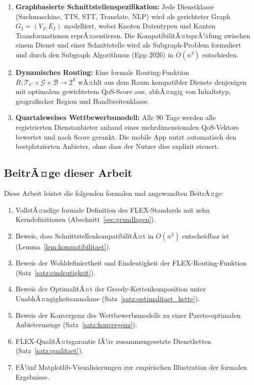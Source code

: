 ﻿\documentclass[a4paper,12pt]{article}
\theoremstyle{definition}
\begin{document}
\begin{enumerate}
    \item \textbf{Graphbasierte Schnittstellenspezifikation:} Jede Dienstklasse (Suchmaschine, TTS, STT, Translate, NLP) wird als gerichteter Graph $G_I = (V_I, E_I)$ modelliert, wobei Knoten Datentypen und Kanten Transformationen reprÃ¤sentieren. Die KompatibilitÃ¤tsprÃ¼fung zwischen einem Dienst und einer Schnittstelle wird als Subgraph-Problem formuliert und durch den Subgraph Algorithmus (Epp 2026) in $O(n^3)$ entschieden.
    \item \textbf{Dynamisches Routing:} Eine formale Routing-Funktion $R: \mathcal{T}_C \times \mathcal{G} \times \mathcal{B} \to 2^{\mathcal{S}}$ wÃ¤hlt aus dem Raum kompatibler Dienste denjenigen mit optimalem gewichtetem QoS-Score aus, abhÃ¤ngig von Inhaltstyp, geografischer Region und Bandbreitenklasse.
    \item \textbf{Quartalsweises Wettbewerbsmodell:} Alle 90 Tage werden alle registrierten Dienstanbieter anhand eines mehrdimensionalen QoS-Vektors bewertet und nach Score gerankt. Die mobile App nutzt automatisch den bestplatzierten Anbieter, ohne dass der Nutzer dies explizit steuert.
\end{enumerate}

\subsection{BeitrÃ¤ge dieser Arbeit}

Diese Arbeit leistet die folgenden formalen und angewandten BeitrÃ¤ge:

\begin{enumerate}
    \item VollstÃ¤ndige formale Definition des FLEX-Standards mit zehn Kerndefinitionen (Abschnitt~\ref{sec:grundlagen}).
    \item Beweis, dass SchnittstellenkompatibilitÃ¤t in $O(n^3)$ entscheidbar ist (Lemma~\ref{lem:kompatibilitaet}).
    \item Beweis der Wohldefiniertheit und Eindeutigkeit der FLEX-Routing-Funktion (Satz~\ref{satz:eindeutigkeit}).
    \item Beweis der OptimalitÃ¤t der Greedy-Kettenkomposition unter UnabhÃ¤ngigkeitsannahme (Satz~\ref{satz:optimalitaet_kette}).
    \item Beweis der Konvergenz des Wettbewerbsmodells zu einer Pareto-optimalen Anbietermenge (Satz~\ref{satz:konvergenz}).
    \item FLEX-QualitÃ¤tsgarantie fÃ¼r zusammengesetzte Dienstketten (Satz~\ref{satz:qualitaet}).
    \item FÃ¼nf Matplotlib-Visualisierungen zur empirischen Illustration der formalen Ergebnisse.
\end{enumerate}
\end{document}
